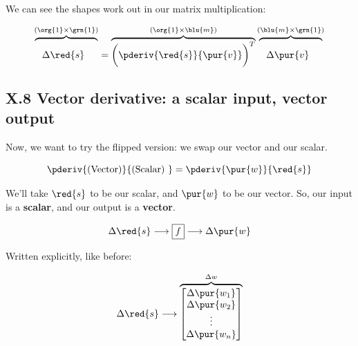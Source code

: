        We can see the shapes work out in our matrix multiplication:
        
        \begin{equation}
            \overbrace{
                \phantom{\bigg(}
                    \Delta \red{s}
                \phantom{\bigg)^T}
            }^{ (\org{1} \times \grn{1}) }
            =
            \overbrace{
                \bigg(
                    \pderiv{\red{s}}{\pur{v}}
                \bigg)^T
            }^{ (\org{1} \times \blu{m}) }
            \overbrace{
                \phantom{\bigg(}
                    \Delta \pur{v}
                \phantom{\bigg)^T}
            }^{ (\blu{m} \times \grn{1}) }
        \end{equation}
        
    \secdiv
    
    \subsection*{X.8 \quad Vector derivative: a scalar input, vector output}
    
        Now, we want to try the flipped version: we swap our vector and our scalar.
        
        \begin{equation}
            \pderiv{ \text{(Vector)} } { \text{(Scalar) } }
            =
            \pderiv{ \pur{w} }{ \red{s} } 
        \end{equation}
        
        We'll take $\red{s}$ to be our scalar, and $\pur{w}$ to be our vector. So, our input is a \textbf{scalar}, and our output is a \textbf{vector}.
        
        \begin{equation}
            \Delta \red{s}
            \longrightarrow
            \boxed{f}
            \longrightarrow
            \Delta \pur{w}
        \end{equation}
        
        Written explicitly, like before:
        
        \begin{equation}
            \Delta \red{s}
            \longrightarrow 
            \overbrace{
                \begin{bmatrix}
                    \Delta \pur{w_1}\\ \Delta \pur{w_2}\\ \vdots \\ \Delta \pur{w_n}
                \end{bmatrix}
            }^{\Delta w}
        \end{equation}
        
